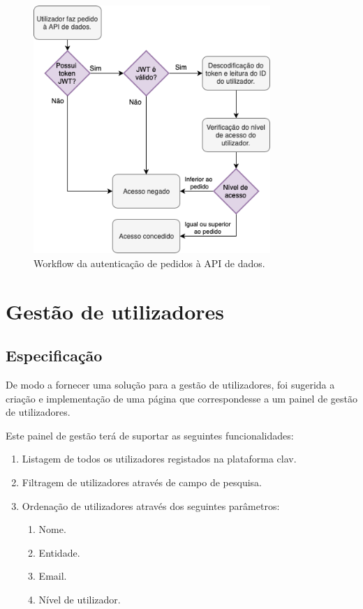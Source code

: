 \begin{figure}[h!]
    \centering
    \includegraphics[width=0.8\textwidth]{img/diagramas/authAPI/AuthAPI.png}
    \caption{Workflow da autenticação de pedidos à API de dados.}
    \label{fig:flow_authCC}
\end{figure}

\cleardoublepage
\section{Gestão de utilizadores} \label{gestaoUtilizadoresSolucao}

\subsection{Especificação}
De modo a fornecer uma solução para a gestão de utilizadores, foi sugerida a criação e implementação de uma página que correspondesse a um painel de gestão de utilizadores.

Este painel de gestão terá de suportar as seguintes funcionalidades:

\begin{enumerate}
    \item Listagem de todos os utilizadores registados na plataforma \gls{clav}.
    \item Filtragem de utilizadores através de campo de pesquisa.
    \item Ordenação de utilizadores através dos seguintes parâmetros:
    \begin{enumerate}
        \item Nome.
        \item Entidade.
        \item Email.
        \item Nível de utilizador.
    \end{enumerate}
\end{enumerate}

